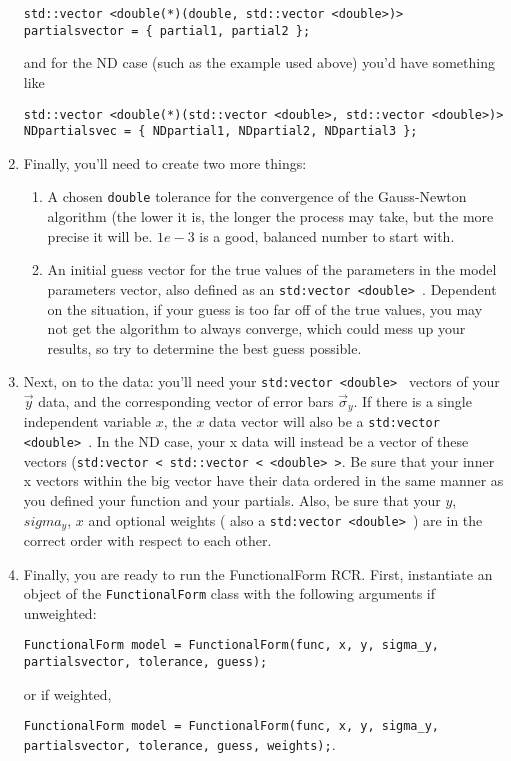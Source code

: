 \documentclass[12pt]{article}
\begin{document}
\begin{enumerate}
	\texttt{std::vector <double(*)(double, std::vector <double>)> partialsvector = \{ partial1, partial2 \};}
	
	and for the ND case (such as the example used above) you'd have something like
	
	\texttt{std::vector <double(*)(std::vector <double>, std::vector <double>)> NDpartialsvec = \{ NDpartial1, NDpartial2, NDpartial3 \};}
	
	\item Finally, you'll need to create two more things: 
	\begin{enumerate}
		\item A chosen \texttt{double} tolerance for the convergence of the Gauss-Newton algorithm (the lower it is, the longer the process may take, but the more precise it will be. $1e-3$ is a good, balanced number to start with.
		\item An initial guess vector for the true values of the parameters in the model parameters vector, also defined as an \texttt{std:vector <double> }. Dependent on the situation, if your guess is too far off of the true values, you may not get the algorithm to always converge, which could mess up your results, so try to determine the best guess possible.
	\end{enumerate}
	\item Next, on to the data: you'll need your \texttt{std:vector <double> } vectors of your $\vec{y}$ data, and the corresponding vector of error bars $\vec{\sigma}_y$. If there is a single independent variable $x$, the $x$ data vector will also be a \texttt{std:vector <double> }. In the ND case, your x data will instead be a vector of these vectors (\texttt{std:vector < std::vector < <double> >}. Be sure that your inner x vectors within the big vector have their data ordered in the same manner as you defined your function and your partials. Also, be sure that your $y$, $sigma_y$, $x$ and optional weights ( also a \texttt{std:vector <double> }) are in the correct order with respect to each other.
	\item Finally, you are ready to run the FunctionalForm RCR. First, instantiate an object of the \texttt{FunctionalForm} class with the following arguments if unweighted:
	
	\texttt{FunctionalForm model = FunctionalForm(func, x, y, sigma\_y, partialsvector, tolerance, guess);}
	
	or if weighted,
	
	\texttt{FunctionalForm model = FunctionalForm(func, x, y, sigma\_y, partialsvector, tolerance, guess, weights);}.
	

\end{enumerate}
\end{document}
